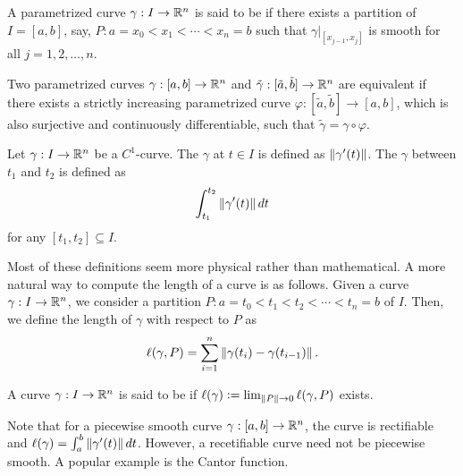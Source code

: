\begin{definition}
    A parametrized curve $\gamma:I \to \mathbb{R}^{n}$ is said to be  if there exists a partition of $I = [a,b]$, say, $P:a = x_{0}<x_{1}<\cdots<x_{n}=b$ such that $\gamma|_{[x_{j-1},x_{j}]}$ is smooth for all $j = 1,2,\ldots,n$.
\end{definition}

\begin{definition}
    Two parametrized curves $\gamma:[a,b] \to \mathbb{R}^{n}$ and $\tilde{\gamma}:[\tilde{a},\tilde{b}] \to \mathbb{R}^{n}$ are equivalent if there exists a strictly increasing parametrized curve $\varphi:[\tilde{a},\tilde{b}] \to [a,b]$, which is also surjective and continuously differentiable, such that $\tilde{\gamma} = \gamma \circ \varphi$.
\end{definition}

\begin{definition}
    Let $\gamma:I \to \mathbb{R}^{n}$ be a $C^{1}$-curve. The  $\gamma$ at $t \in I$ is defined as $\left\lVert\gamma'(t)\right\rVert$. The  $\gamma$ between $t_{1}$ and $t_{2}$ is defined as
    \begin{align}
        \int_{t_{1}}^{t_{2}} \left\lVert\gamma'(t)\right\rVert dt
    \end{align}
    for any $[t_{1},t_{2}] \subseteq I$.
\end{definition}

Most of these definitions seem more physical rather than mathematical. A more natural way to compute the length of a curve is as follows. Given a curve $\gamma:I \to \mathbb{R}^{n}$, we consider a partition $P:a=t_{0} < t_{1} < t_{2} < \cdots < t_{n} = b$ of $I$. Then, we define the length of $\gamma$ with respect to $P$ as
\begin{align}
    \ell(\gamma,P) = \sum_{i=1}^{n} \left\lVert\gamma(t_{i})-\gamma(t_{i-1})\right\rVert.
\end{align}

\begin{definition}
    A curve $\gamma:I \to \mathbb{R}^{n}$ is said to be  if $\ell(\gamma) \vcentcolon= \lim_{\left\lVert P\right\rVert \to 0} \ell(\gamma,P)$ exists.
\end{definition}

Note that for a piecewise smooth curve $\gamma:[a,b] \to \mathbb{R}^{n}$, the curve is rectifiable and $\ell(\gamma) = \int_{a}^{b} \left\lVert\gamma'(t)\right\rVert dt$. However, a recetifiable curve need not be piecewise smooth. A popular example is the Cantor function.